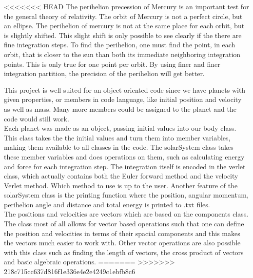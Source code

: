 \documentclass[10pt,a4paper]{article}
\begin{document}
<<<<<<< HEAD
The perihelion precession of Mercury is an important test for the general theory of relativity. The orbit of Mercury is not a perfect circle, but an ellipse. The perihelion of mercury is not at the same place for each orbit, but is slightly shifted. This slight shift is only possible to see clearly if the there are fine integration steps. To find the perihelion, one must find the point, in each orbit, that is closer to the sun than both its immediate neighboring integration points. This is only true for one point per orbit. By using finer and finer integration partition, the precision of the perihelion will get better.   

\noindent This project is well suited for an object oriented code since we have planets with given properties, or members in code language, like initial position and velocity as well as mass. Many more members could be assigned to the planet and the code would still work. 
\\
Each planet was made as an object, passing initial values into our body class. This class takes the the initial values and turn them into member variables, making them available to all classes in the code. The solarSystem class takes these member variables and does operations on them, such as calculating energy and force for each integration step. The integration itself is encoded in the verlet class, which actually contains both the Euler forward method and the velocity Verlet method. Which method to use is up to the user. Another feature of the solarSystem class is the printing function where the position, angular momentum, perihelion angle and distance and total energy is printed to .txt files.
\\
The positions and velocities are vectors which are based on the components class. The class most of all allows for vector based operations such that one can define the position and velocities in terms of their spacial components and this makes the vectors much easier to work with. Other vector operations are also possible with this class such as finding the length of vectors, the cross product of vectors and basic algebraic operations.
=======
>>>>>>> 218c715cc637d816f1e336e4e2e4249c1ebfb8c6
\end{document}
